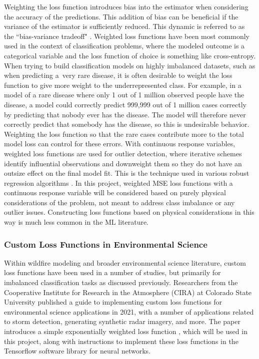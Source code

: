 \documentclass[11pt]{article}%
\begin{document}
Weighting the loss function introduces bias into the estimator when considering the accuracy of the predictions. This addition of bias can be beneficial if the variance of the estimator is sufficiently reduced. This dynamic is referred to as the ``bias-variance tradeoff" \citep[p.\ 37]{Hastie-2010-ESL}. Weighted loss functions have been most commonly used in the context of classification problems, where the modeled outcome is a categorical variable and the loss function of choice is something like cross-entropy. When trying to build classification models on highly imbalanced datasets, such as when predicting a~very rare disease, it is often desirable to weight the loss function to give more weight to the underrepresented class. For example, in a model of a rare disease where only 1 out of 1 million observed people have the disease, a model could correctly predict 999,999 out of 1 million cases correctly by predicting that nobody ever has the disease. The model will therefore never correctly predict that somebody has the disease, so this is undesirable behavior. Weighting the loss function so that the rare cases contribute more to the total model loss can control for these errors. With continuous response variables, weighted loss functions are used for outlier detection, where iterative schemes identify influential observations and downweight them so they do not have an outsize effect on the final model fit. This is the technique used in various robust regression algorithms \citep{OLeary-1990-RRC}. In this project, weighted MSE loss functions with a continuous response variable will be considered based on purely physical considerations of the problem, not meant to address class imbalance or any outlier issues. Constructing loss functions based on physical considerations in this way is much less common in the ML literature.

\subsubsection{Custom Loss Functions in Environmental Science}
\hfill

Within wildfire modeling and broader environmental science literature, custom loss functions have been used in a number of studies, but primarily for imbalanced classification tasks as discussed previously. Researchers from the Cooperative Institute for Research in the Atmosphere (CIRA) at Colorado State University published a guide to implementing custom loss functions for environmental science applications in 2021, with a number of applications related to storm detection, generating synthetic radar imagery, and more. The paper introduces a simple exponentially weighted loss function \citep[p.\ 7]{Ebert-2021-GCL}, which will be used in this project, along with instructions to implement these loss functions in the Tensorflow software library for neural networks.
\end{document}
